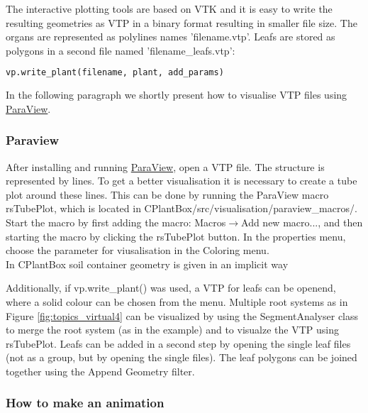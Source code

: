 The interactive plotting tools are based on VTK and it is easy to write the resulting geometries as VTP in a binary format resulting in smaller file size. The organs are represented as polylines names 'filename.vtp'. Leafs are stored as polygons in a second file named 'filename\_leafs.vtp':
\begin{lstlisting}[language=Python]
vp.write_plant(filename, plant, add_params)
\end{lstlisting}



In the following paragraph we shortly present how to visualise VTP files using \href{https://www.paraview.org/}{ParaView}.


\subsubsection*{Paraview}

After installing and running \href{https://www.paraview.org/}{ParaView}, open a VTP file. The structure is represented by lines. To get a better visualisation it is necessary to create a tube plot around these lines. This can be done by running the ParaView macro rsTubePlot, which is located in CPlantBox/src/visualisation/paraview\_macros/. Start the macro by first adding the macro: Macros$\rightarrow$Add new macro..., and then starting the macro by clicking the rsTubePlot button. In the properties menu, choose the parameter for viusalisation in the Coloring menu.\\

In CPlantBox soil container geometry is given in an implicit way

Additionally, if vp.write\_plant() was used, a VTP for leafs can be openend, where a solid colour can be chosen from the menu. Multiple root systems as in Figure \ref{fig:topics_virtual4} can be visualized by using the SegmentAnalyser class to merge the root system (as in the example) and to visualze the 
VTP using rsTubePlot. Leafs can be added in a second step by opening the single leaf files (not as a group, but by opening the single files). The leaf polygons can be joined together using the Append Geometry filter.

\subsubsection*{How to make an animation} 

